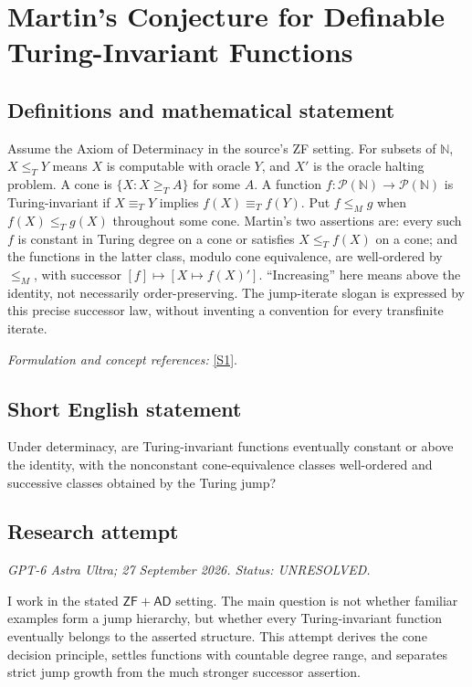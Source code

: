 \documentclass[11pt]{article}
\begin{document}
\section*{\texorpdfstring{Martin's Conjecture for Definable Turing-Invariant Functions}{Martin's Conjecture for Definable Turing-Invariant Functions}}\label{30006916}
\subsection{Definitions and mathematical statement}
Assume the Axiom of Determinacy in the source's ZF setting. For subsets of ${\mathbb{N}}$, $X\le_TY$ means $X$ is computable with oracle $Y$, and $X'$ is the oracle halting problem. A cone is $\{X:X\ge_TA\}$ for some $A$. A function $f:\mathcal P({\mathbb{N}})\to\mathcal P({\mathbb{N}})$ is Turing-invariant if $X\equiv_TY$ implies $f(X)\equiv_Tf(Y)$. Put $f\le_Mg$ when $f(X)\le_Tg(X)$ throughout some cone. Martin's two assertions are: every such $f$ is constant in Turing degree on a cone or satisfies $X\le_Tf(X)$ on a cone; and the functions in the latter class, modulo cone equivalence, are well-ordered by $\le_M$, with successor $[f]\mapsto[X\mapsto f(X)']$. ``Increasing'' here means above the identity, not necessarily order-preserving. The jump-iterate slogan is expressed by this precise successor law, without inventing a convention for every transfinite iterate.
\par\smallskip\textit{Formulation and concept references:} \href{https://arxiv.org/html/2510.19147}{[S1]}.

\subsection{Short English statement}
Under determinacy, are Turing-invariant functions eventually constant or above the identity, with the nonconstant cone-equivalence classes well-ordered and successive classes obtained by the Turing jump?
\subsection{Research attempt}
\textit{GPT-6 Astra Ultra; 27 September 2026. Status: UNRESOLVED.}

I work in the stated $\mathsf{ZF}+\mathsf{AD}$ setting. The main
question is not whether familiar examples form a jump hierarchy, but
whether every Turing-invariant function eventually belongs to the
asserted structure. This attempt derives the cone decision principle,
settles functions with countable degree range, and separates strict
jump growth from the much stronger successor assertion.
\end{document}
